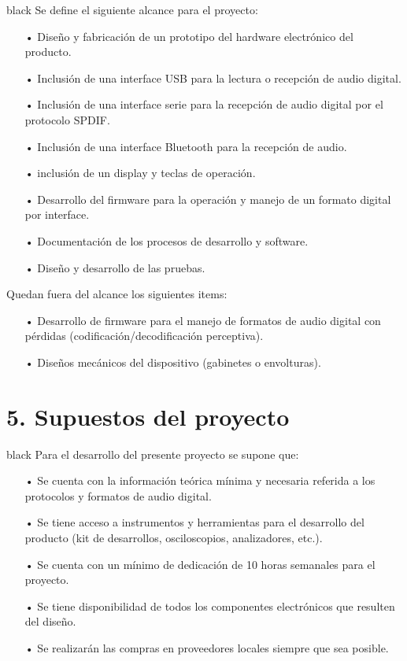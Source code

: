 \documentclass[
11pt, %
]{charter}
\begin{document}
\begin{consigna}{black}
Se define el siguiente alcance para el proyecto:
\begin{itemize}
	\item[•]Diseño y fabricación de un prototipo del hardware electrónico del producto.  
	\item[•]Inclusión de una interface USB para la lectura o recepción de audio digital. 
	\item[•]Inclusión de una interface serie para la recepción de audio digital por el protocolo SPDIF.
	\item[•]Inclusión de una interface Bluetooth para la recepción de audio.
	\item[•]inclusión de un display y teclas de operación.
	\item[•]Desarrollo del firmware para la operación y manejo de un formato digital por interface.
	\item[•]Documentación de los procesos de desarrollo y software.
	\item[•]Diseño y desarrollo de las pruebas.  
\end{itemize}	
Quedan fuera del alcance los siguientes items:
\begin{itemize}
	\item[•]Desarrollo de firmware para el manejo de formatos de audio digital con pérdidas (codificación/decodificación perceptiva).  
	\item[•]Diseños mecánicos del dispositivo (gabinetes o envolturas). 	
\end{itemize}
\end{consigna}


\section{5. Supuestos del proyecto}
\label{sec:supuestos}

\begin{consigna}{black}
Para el desarrollo del presente proyecto se supone que:

\begin{itemize}
	\item[•]Se cuenta con la información teórica mínima y necesaria referida a los protocolos y formatos de audio digital. 
	\item[•]Se tiene acceso a instrumentos y herramientas para el desarrollo del producto (kit de desarrollos, osciloscopios, analizadores, etc.).
	\item[•]Se cuenta con un mínimo de dedicación de 10 horas semanales para el proyecto.
	\item[•]Se tiene disponibilidad de todos los componentes electrónicos que resulten del diseño.
	\item[•]Se realizarán las compras en proveedores locales siempre que sea posible.  
\end{itemize}

\end{consigna}
\end{document}

